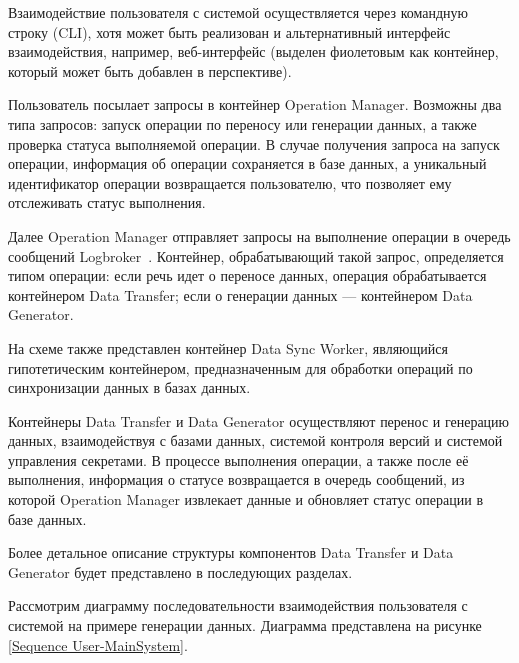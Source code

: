 Взаимодействие пользователя с системой осуществляется через командную строку (CLI), хотя может быть реализован и альтернативный интерфейс взаимодействия, например, веб-интерфейс (выделен фиолетовым как контейнер, который может быть добавлен в перспективе).

Пользователь посылает запросы в контейнер Operation Manager. Возможны два типа запросов: запуск операции по переносу или генерации данных, а также проверка статуса выполняемой операции. В случае получения запроса на запуск операции, информация об операции сохраняется в базе данных, а уникальный идентификатор операции возвращается пользователю, что позволяет ему отслеживать статус выполнения.

Далее Operation Manager отправляет запросы на выполнение операции в очередь сообщений Logbroker~\cite{logbroker}. Контейнер, обрабатывающий такой запрос, определяется типом операции: если речь идет о переносе данных, операция обрабатывается контейнером Data Transfer; если о генерации данных — контейнером Data Generator.

На схеме также представлен контейнер Data Sync Worker, являющийся гипотетическим контейнером, предназначенным для обработки операций по синхронизации данных в базах данных.

Контейнеры Data Transfer и Data Generator осуществляют перенос и генерацию данных, взаимодействуя с базами данных, системой контроля версий и системой управления секретами. В процессе выполнения операции, а также после её выполнения, информация о статусе возвращается в очередь сообщений, из которой Operation Manager извлекает данные и обновляет статус операции в базе данных.

Более детальное описание структуры компонентов Data Transfer и Data Generator будет представлено в последующих разделах.

Рассмотрим диаграмму последовательности взаимодействия пользователя с системой на примере генерации данных. Диаграмма представлена на рисунке \ref{Sequence User-MainSystem}.

